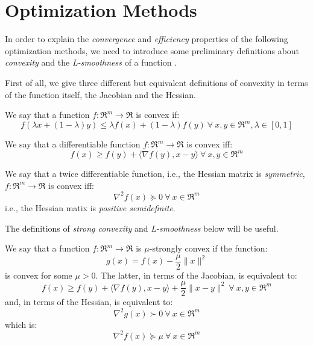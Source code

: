 \section{Optimization Methods}

In order to explain the \emph{convergence} and \emph{efficiency} properties of the following optimization methods, we need to introduce some preliminary definitions about \emph{convexity} and the \emph{L-smoothness} of a function \cite{boyd2004convex}.

First of all, we give three different but equivalent definitions of convexity in terms of the function itself, the Jacobian and the Hessian.

\begin{definition}[Convexity] \label{def:convexity}
We say that a function $f: \Re^m \rightarrow \Re$ is convex if:
$$ 
f(\lambda x + (1 - \lambda) y ) \leq \lambda f(x) + (1 - \lambda) f(y) \ \forall \ x, y \in \Re^m, \lambda \in [0,1]
$$
\end{definition}

\begin{definition} \label{def:convexity_jac}
We say that a differentiable function $f: \Re^m \rightarrow \Re$ is convex iff:
$$
f(x) \geq f(y) + \langle \nabla f(y), x - y \rangle \ \forall \ x, y \in \Re^m
$$
\end{definition}

\begin{definition} \label{def:convexity_hess}
We say that a twice differentiable function, i.e., the Hessian matrix is \emph{symmetric}, $f: \Re^m \rightarrow \Re$ is convex iff:
$$
\nabla^2 f(x) \succeq 0 \ \forall \ x \in \Re^m
$$
i.e., the Hessian matix is \emph{positive semidefinite}.
\end{definition}

The definitions of \emph{strong convexity} and \emph{L-smoothness} below will be useful.

\begin{definition} \label{def:strong_convexity}
We say that a function $f: \Re^m \rightarrow \Re$ is $\mu$-strongly convex if the function:
$$
g(x) = f(x) - \frac{\mu}{2} \| x \|^2
$$
is convex for some $\mu > 0$. The latter, in terms of the Jacobian, is equivalent to:
$$
f(x) \geq f(y) + \langle \nabla f(y), x - y \rangle + \frac{\mu}{2} \| x - y \|^2 \ \forall \ x, y \in \Re^m
$$
and, in terms of the Hessian, is equivalent to:
$$
\nabla^2 g(x) \succ 0 \ \forall \ x \in \Re^m
$$
which is:
$$
\nabla^2 f(x) \succeq \mu \ \forall \ x \in \Re^m
$$
\end{definition}

